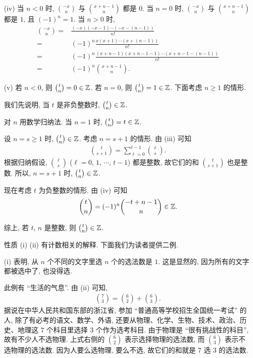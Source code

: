 \begin{pf}
    (iv) 当 $n<0$ 时, $\binom{-x}{n}$ 与 $\binom{x + n - 1}{n}$ 都是 $0$. 当 $n=0$ 时, $\binom{-x}{n}$ 与 $\binom{x + n - 1}{n}$ 都是 $1$, 且 $(-1)^n = 1$. 当 $n>0$ 时,
    \begin{align*}
        \binom{-x}{n}
        = {} & \frac{(-x)(-x-1) \cdots (-x-(n-1))}{n!}                 \\
        = {} & (-1)^n \frac{x(x+1) \cdots (x+(n-1))}{n!}               \\
        = {} & (-1)^n \frac{(x+n-1)(x+n-1-1) \cdots (x+n-1-(n-1))}{n!} \\
        = {} & (-1)^n \binom{x+n-1}{n}.
    \end{align*}

    (v) 若 $n < 0$, 则 $\binom{t}{n} = 0 \in \mathbb{Z}$. 若 $n = 0$, 则 $\binom{t}{n} = 1 \in \mathbb{Z}$. 下面考虑 $n \geq 1$ 的情形.

    我们先说明, 当 $t$ 是非负整数时, $\binom{t}{n} \in \mathbb{Z}$.

    对 $n$ 用数学归纳法. 当 $n = 1$ 时, $\binom{t}{n} = t \in \mathbb{Z}$.

    设 $n = s \geq 1$ 时, $\binom{t}{n} \in \mathbb{Z}$. 考虑 $n = s + 1$ 的情形. 由 (iii) 可知
    \begin{align*}
        \binom{t}{s + 1} = \sum_{\ell = 0}^{t - 1} \binom{\ell}{s}.
    \end{align*}
    根据归纳假设, $\binom{\ell}{s}$ ($\ell = 0$, $1$, $\cdots$, $t-1$) 都是整数, 故它们的和 $\binom{t}{s + 1}$ 也是整数. 所以, $n = s + 1$ 时, $\binom{t}{n} \in \mathbb{Z}$.

    现在考虑 $t$ 为负整数的情形. 由 (iv) 可知
    \begin{align*}
        \binom{t}{n} = (-1)^n \binom{-t + n - 1}{n} \in \mathbb{Z}.
    \end{align*}

    综上, 若 $t$, $n$ 是整数, 则 $\binom{t}{n} \in \mathbb{Z}$.
\end{pf}

性质 (i) (ii) 有计数相关的解释. 下面我们为读者提供二例.

\begin{example}
    (i) 表明, 从 $n$ 个不同的文字里选 $n$ 个的选法数是 $1$. 这是显然的, 因为所有的文字都被选中了, 也没得选.
\end{example}

\begin{example}
    此例有 ``生活的气息''. 由 (ii) 可知,
    \begin{align*}
        \binom{7}{3} = \binom{6}{2} + \binom{6}{3}.
    \end{align*}
    据说在中华人民共和国东部的浙江省, 参加 ``普通高等学校招生全国统一考试''  的人, 除了有必考的语文、数学、外语, 还要从物理、化学、生物、技术、政治、历史、地理这 $7$ 个科目里选择 $3$ 个作为选考科目. 由于物理是 ``很有挑战性的科目'', 故有不少人不选物理. 上式右侧的 $\binom{6}{2}$ 表示选择物理的选法数, 而 $\binom{6}{3}$ 表示不选物理的选法数. 因为人要么选物理, 要么不选, 故它们的和就是 $7$ 选 $3$ 的选法数.
\end{example}

